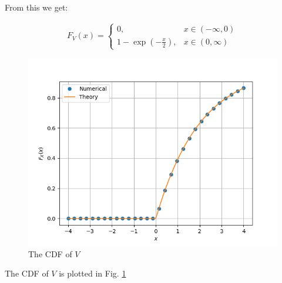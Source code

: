 \documentclass[journal,12pt,twocolumn]{IEEEtran}
\renewcommand\thesection{\arabic{section}}
\begin{document}
\begin{enumerate}[label=\thesection.\arabic*
,ref=\thesection.\theenumi]
    From this we get:
    
    \begin{align}
       F_V(x) =
        \begin{cases}
            0, & x \in (-\infty,0) \\
            1 - \exp{\left(-\frac{x}{2}\right)}, & x \in (0,\infty) 
        \end{cases}
    \end{align}

    \begin{figure}
        \centering
        \includegraphics[width=\columnwidth]{./figures/CDF_log.png}
        \caption{The CDF of $V$}
        \label{fig:log_cdf}
        \end{figure}
    The CDF of $V$ is plotted in Fig. \ref{fig:log_cdf}

%

    \end{enumerate}
\end{document}

